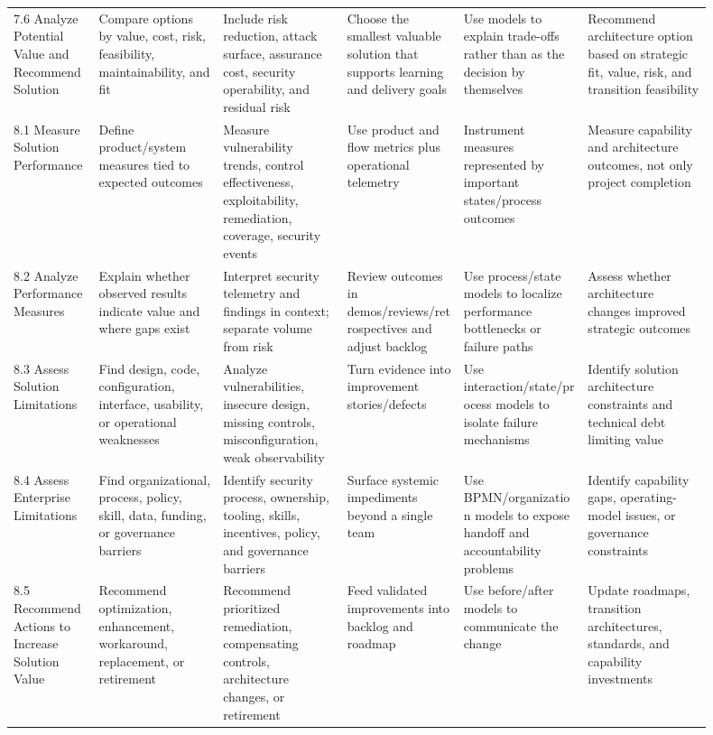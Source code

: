 \documentclass[11pt]{article}
\begin{document}
\begin{landscape}
\begin{longtable}{L{0.11\linewidth} L{0.16\linewidth} L{0.16\linewidth} L{0.15\linewidth} L{0.16\linewidth} L{0.16\linewidth}}
7.6 Analyze Potential Value and Recommend Solution & Compare options by value, cost, risk, feasibility, maintainability, and fit & Include risk reduction, attack surface, assurance cost, security operability, and residual risk & Choose the smallest valuable solution that supports learning and delivery goals & Use models to explain trade-offs rather than as the decision by themselves & Recommend architecture option based on strategic fit, value, risk, and transition feasibility\\
8.1 Measure Solution Performance & Define product/system measures tied to expected outcomes & Measure vulnerability trends, control effectiveness, exploitability, remediation, coverage, security events & Use product and flow metrics plus operational telemetry & Instrument measures represented by important states/process outcomes & Measure capability and architecture outcomes, not only project completion\\
8.2 Analyze Performance Measures & Explain whether observed results indicate value and where gaps exist & Interpret security telemetry and findings in context; separate volume from risk & Review outcomes in demos/reviews/retrospectives and adjust backlog & Use process/state models to localize performance bottlenecks or failure paths & Assess whether architecture changes improved strategic outcomes\\
8.3 Assess Solution Limitations & Find design, code, configuration, interface, usability, or operational weaknesses & Analyze vulnerabilities, insecure design, missing controls, misconfiguration, weak observability & Turn evidence into improvement stories/defects & Use interaction/state/process models to isolate failure mechanisms & Identify solution architecture constraints and technical debt limiting value\\
8.4 Assess Enterprise Limitations & Find organizational, process, policy, skill, data, funding, or governance barriers & Identify security process, ownership, tooling, skills, incentives, policy, and governance barriers & Surface systemic impediments beyond a single team & Use BPMN/organization models to expose handoff and accountability problems & Identify capability gaps, operating-model issues, or governance constraints\\
8.5 Recommend Actions to Increase Solution Value & Recommend optimization, enhancement, workaround, replacement, or retirement & Recommend prioritized remediation, compensating controls, architecture changes, or retirement & Feed validated improvements into backlog and roadmap & Use before/after models to communicate the change & Update roadmaps, transition architectures, standards, and capability investments\\
\bottomrule
\end{longtable}
\normalsize
\end{landscape}
\end{document}
